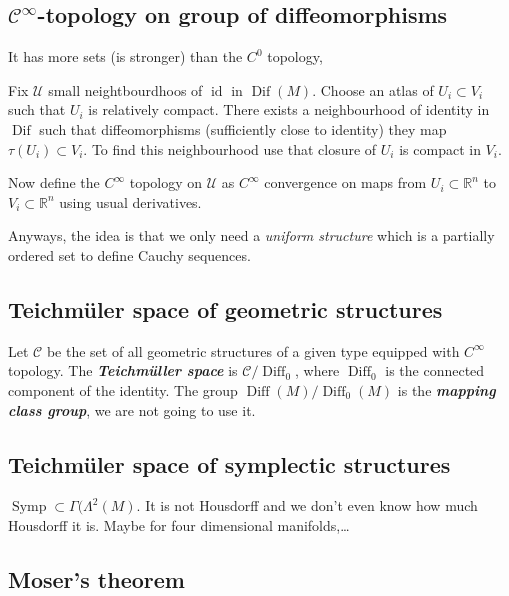 \subsection{$\mathcal{C}^\infty$-topology on group of diffeomorphisms}

It has more sets (is stronger) than the $C^0$ topology, 


\begin{defn}
	Fix $\mathcal{U}$ small neightbourdhoos of $\operatorname{id}$ in $\operatorname{Dif}(M)$. Choose an atlas of $U_i\subset V_i$ such that $U_i$ is relatively compact. There exists a neighbourhood of identity in $\operatorname{Dif}$ such that diffeomorphisms (sufficiently close to identity) they map $\tau (U_i)\subset V_i$. To find this neighbourhood use that closure of $U_i$ is compact in $V_i$.

	Now define the $C^\infty$ topology on $\mathcal{U}$ as $C^\infty$ convergence on maps from $U_i\subset \mathbb{R}^n$ to $V_i\subset \mathbb{R}^{n}$ using usual derivatives.
\end{defn}

Anyways, the idea is that we only need a \textit{uniform structure}  which is a partially ordered set to define Cauchy sequences.

\subsection{Teichm\"uler space of geometric structures}

Let $\mathcal{C}$ be the set of all geometric structures of a given type equipped with $C^\infty$ topology. The \textit{\textbf{Teichm\"uller space}} is  $\mathcal{C}/\operatorname{Diff}_0$, where $\operatorname{Diff}_{0}$ is the connected component of the identity. The group $\operatorname{Diff}(M)/ \operatorname{Diff}_0(M)$ is the \textit{\textbf{mapping class group}}, we are not going to use it.

\subsection{Teichm\"uler space of symplectic structures}

$\operatorname{Symp}\subset \Gamma(\Lambda^{2}(M)$. It is not Housdorff and we don't even know how much Housdorff it is. Maybe for four dimensional manifolds,…

\subsection{Moser's theorem}

